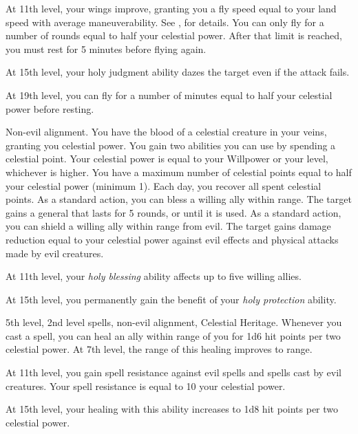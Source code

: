     At 11th level, your wings improve, granting you a fly speed equal to your land speed with average maneuverability.
    See , for details.
    You can only fly for a number of rounds equal to half your celestial power.
    After that limit is reached, you must rest for 5 minutes before flying again.

    At 15th level, your holy judgment ability dazes the target even if the attack fails.

    At 19th level, you can fly for a number of minutes equal to half your celestial power before resting.

    \featpres Non-evil alignment.
    \featben You have the blood of a celestial creature in your veins, granting you celestial power.
    You gain two abilities you can use by spending a celestial point.
    Your celestial power is equal to your Willpower or your level, whichever is higher.
    You have a maximum number of celestial points equal to half your celestial power (minimum 1).
    Each day, you recover all spent celestial points.
     As a standard action, you can bless a willing ally within \rngmed range. The target gains a general  that lasts for 5 rounds, or until it is used.
     As a standard action, you can shield a willing ally within \rngclose range from evil. The target gains damage reduction equal to your celestial power against evil effects and physical attacks made by evil creatures.

    At 11th level, your \textit{holy blessing} ability affects up to five willing allies.

    At 15th level, you permanently gain the benefit of your \textit{holy protection} ability.

    \featpres 5th level, 2nd level spells, non-evil alignment, Celestial Heritage.
    \featben Whenever you cast a spell, you can heal an ally within \rngclose range of you for 1d6 hit points per two celestial power.
    At 7th level, the range of this healing improves to \rngmed range.

    At 11th level, you gain spell resistance against evil spells and spells cast by evil creatures.
    Your spell resistance is equal to 10 \add your celestial power.

    At 15th level, your healing with this ability increases to 1d8 hit points per two celestial power.

